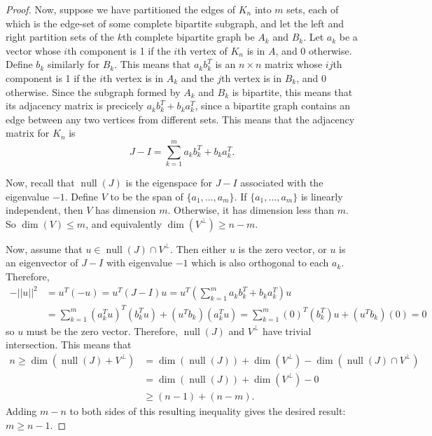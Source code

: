 \documentclass[12pt]{article}
\DeclareMathOperator{\Null}{null}
\begin{document}
\begin{enumerate}[leftmargin=0cm,itemindent=.5cm,labelwidth=\itemindent,labelsep=0cm,align=left]
\begin{proof}
Now, suppose we have partitioned the edges of $K_n$ into $m$ sets, each of which is the edge-set of some complete bipartite subgraph, and let the left and right partition sets of the $k$th complete bipartite graph be $A_k$ and $B_k$.  Let $a_k$ be a vector whose $i$th component is 1 if the $i$th vertex of $K_n$ is in $A$, and 0 otherwise.  Define $b_k$ similarly for $B_k$.  This means that $a_k b_k^T$ is an $n \times n$ matrix whose $ij$th component is 1 if the $i$th vertex is in $A_k$ and the $j$th vertex is in $B_k$, and $0$ otherwise.  Since the subgraph formed by $A_k$ and $B_k$ is bipartite, this means that its adjacency matrix is precicely $a_kb_k^T + b_ka_k^T$, since a bipartite graph contains an edge between any two vertices from different sets.  This means that the adjacency matrix for $K_n$ is
$$
J-I = 
\sum\limits_{k=1}^m a_kb_k^T + b_ka_k^T.
$$

Now, recall that $\Null(J)$ is the eigenspace for $J-I$ associated with the eigenvalue $-1$.  Define $V$ to be the span of $\{a_1, \dots , a_m \}$.  If $\{a_1, \dots , a_m \}$ is linearly independent, then $V$ has dimension $m$.  Otherwise, it has dimension less than $m$.  So $\dim (V) \leq m$, and equivalently $\dim(V^{\perp}) \geq n-m$.

Now, assume that $u \in \Null(J) \cap V^{\perp}$.  Then either $u$ is the zero vector, or $u$ is an eigenvector of $J-I$ with eigenvalue $-1$ which is also orthogonal to each $a_k$.  Therefore,
\begin{align*}
-||u||^2 &= u^T(-u) = u^T(J-I)u = u^T \left( \sum\limits_{k=1}^m a_kb_k^T + b_ka_k^T \right) u
\\
&= \sum\limits_{k=1}^m (a_k^T u)^T (b_k^T u) + (u^T b_k) (a_k^Tu) = \sum\limits_{k=1}^m (0)^T (b_k^T) u + (u^T b_k) (0) = 0
\end{align*}
so $u$ must be the zero vector.  Therefore, $\Null (J)$ and $V^{\perp}$ have trivial intersection.  This means that
\begin{align*}
n \geq \dim(\Null(J) + V^{\perp}) &= \dim(\Null(J)) + \dim(V^{\perp}) - \dim(\Null(J) \cap V^{\perp})
\\
&= \dim(\Null(J)) + \dim(V^{\perp}) - 0
\\
&\geq (n-1) + (n - m).
\end{align*}
Adding $m-n$ to both sides of this resulting inequality gives the desired result: $m \geq n-1$.
\end{proof}






\end{enumerate}
\end{document}

